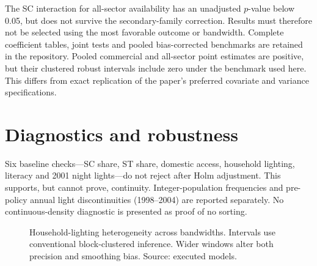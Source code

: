 \documentclass[11pt,a4paper]{article}
\begin{document}
The SC interaction for all-sector availability has an unadjusted $p$-value below 0.05, but does not survive the secondary-family correction. Results must therefore not be selected using the most favorable outcome or bandwidth. Complete coefficient tables, joint tests and pooled bias-corrected benchmarks are retained in the repository. Pooled commercial and all-sector point estimates are positive, but their clustered robust intervals include zero under the benchmark used here. This differs from exact replication of the paper's preferred covariate and variance specifications.

\section{Diagnostics and robustness}
Six baseline checks---SC share, ST share, domestic access, household lighting, literacy and 2001 night lights---do not reject after Holm adjustment. This supports, but cannot prove, continuity. Integer-population frequencies and pre-policy annual light discontinuities (1998--2004) are reported separately. No continuous-density diagnostic is presented as proof of no sorting.

\begin{figure}[htbp]\centering
{}
\caption{Household-lighting heterogeneity across bandwidths. Intervals use conventional block-clustered inference. Wider windows alter both precision and smoothing bias. Source: executed models.}
\label{fig:bandwidth}
\end{figure}
\end{document}
